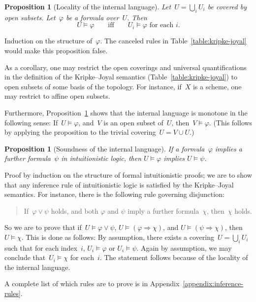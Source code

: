 \documentclass[10pt,reqno,a4paper]{amsbook}
\makeatletter
\theoremstyle{definition}
\theoremstyle{plain}
\newtheorem{prop}[defn]{Proposition}
\theoremstyle{remark}
\newcommand{\?}{\,{:}\,}
\renewcommand{\_}{\mathpunct{.}\,}
\renewenvironment{proof}[1][\proofname]{\par
  \pushQED{\qed}%
  \normalfont \topsep6\p@\@plus6\p@\relax
  \trivlist
  \item[\hskip\labelsep
        \itshape
    #1\@addpunct{.}]\ignorespaces
}{%
  \popQED\endtrivlist\@endpefalse
}
\makeatother
\begin{document}
\begin{prop}[Locality of the internal language]
\label{prop:locality-of-the-internal-language}
Let~$U = \bigcup_i U_i$ be covered by open subsets. Let~$\varphi$
be a formula over~$U$. Then
\[ U \models \varphi \qquad\text{iff}\qquad
  \text{$U_i \models \varphi$ for each $i$}. \]
\end{prop}
\begin{proof}Induction on the structure of~$\varphi$. The canceled
rules in Table~\ref{table:kripke-joyal} would make this proposition false.\end{proof}

As a corollary, one may restrict the open coverings and universal
quantifications in the definition of the Kripke--Joyal semantics
(Table~\ref{table:kripke-joyal}) to open subsets of some basis of the topology.
For instance, if~$X$ is a scheme, one may restrict to affine open subsets.

Furthermore, Proposition~\ref{prop:locality-of-the-internal-language} shows that the internal language is monotone in
the following sense: If~$U \models \varphi$, and~$V$ is an open subset of~$U$,
then~$V \models \varphi$. (This follows by applying the proposition to the
trivial covering~$U = V \cup U$.)

\begin{prop}[Soundness of the internal language]
\label{prop:soundness-of-the-internal-language}
If a formula~$\varphi$ implies a further formula~$\psi$ in intuitionistic logic, then
$U \models \varphi$ implies $U \models \psi$.
\end{prop}
\begin{proof}
Proof by induction on the structure of formal intuitionistic proofs; we are to
show that any inference rule of intuitionistic logic is satisfied by the
Kripke--Joyal semantics. For instance, there is the following rule governing
disjunction:
\begin{quote}
If~$\varphi \vee \psi$ holds, and both $\varphi$ and $\psi$ imply a further
formula~$\chi$, then~$\chi$ holds.
\end{quote}
So we are to prove that if~$U \models \varphi \vee \psi$, $U \models (\varphi
\Rightarrow \chi)$, and $U \models (\psi \Rightarrow \chi)$, then $U \models \chi$.
This is done as follows: By assumption, there exists a covering~$U = \bigcup_i
U_i$ such that for each index~$i$, $U_i \models \varphi$ or $U_i \models \psi$.
Again by assumption, we may conclude that~$U_i \models \chi$ for each~$i$. The statement
follows because of the locality of the internal language.

A complete list of which rules are to prove is
in Appendix~\ref{appendix:inference-rules}.
\end{proof}
\end{document}
